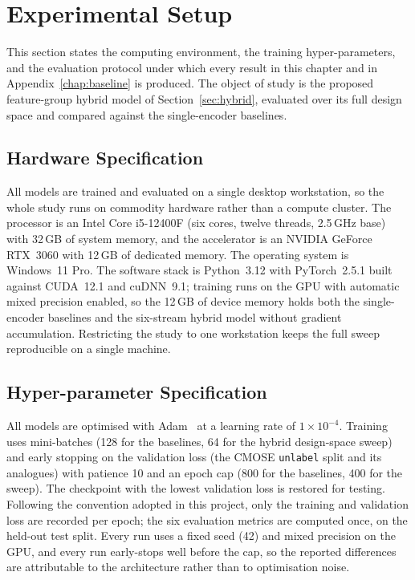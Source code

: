 \documentclass[../main.tex]{subfiles}
\begin{document}
\FloatBarrier
\section{Experimental Setup}
\label{sec:setup-hybrid}

This section states the computing environment, the training hyper-parameters, and the evaluation protocol under which every result in this chapter and in Appendix~\ref{chap:baseline} is produced. The object of study is the proposed feature-group hybrid model of Section~\ref{sec:hybrid}, evaluated over its full design space and compared against the single-encoder baselines.

\subsection{Hardware Specification}
\label{sec:hardware}

All models are trained and evaluated on a single desktop workstation, so the whole study runs on commodity hardware rather than a compute cluster. The processor is an Intel Core i5-12400F (six cores, twelve threads, 2.5\,GHz base) with 32\,GB of system memory, and the accelerator is an NVIDIA GeForce RTX~3060 with 12\,GB of dedicated memory. The operating system is Windows~11 Pro. The software stack is Python~3.12 with PyTorch~2.5.1 built against CUDA~12.1 and cuDNN~9.1; training runs on the GPU with automatic mixed precision enabled, so the 12\,GB of device memory holds both the single-encoder baselines and the six-stream hybrid model without gradient accumulation. Restricting the study to one workstation keeps the full sweep reproducible on a single machine.

\subsection{Hyper-parameter Specification}
\label{sec:losses-method}

All models are optimised with Adam~\cite{adam} at a learning rate of $1\times10^{-4}$. Training uses mini-batches (128 for the baselines, 64 for the hybrid design-space sweep) and early stopping on the validation loss (the CMOSE \texttt{unlabel} split and its analogues) with patience 10 and an epoch cap (800 for the baselines, 400 for the sweep). The checkpoint with the lowest validation loss is restored for testing. Following the convention adopted in this project, only the training and validation loss are recorded per epoch; the six evaluation metrics are computed once, on the held-out test split. Every run uses a fixed seed (42) and mixed precision on the GPU, and every run early-stops well before the cap, so the reported differences are attributable to the architecture rather than to optimisation noise.
\label{sec:training}
\end{document}
